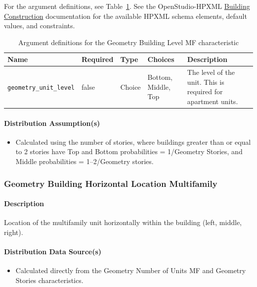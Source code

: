For the argument definitions, see Table~\ref{table:hc_arg_def_build_lev_mf}. See the OpenStudio-HPXML \href{https://openstudio-hpxml.readthedocs.io/en/v1.8.1/workflow_inputs.html#hpxml-building-construction}{Building Construction} documentation for the available HPXML schema elements, default values, and constraints.

\begin{longtable}[]{ |p{}|p{1.5cm}|p{1.1cm}|p{1.4cm}|p{6cm}| }
\caption{Argument definitions for the Geometry Building Level MF characteristic} \label{table:hc_arg_def_build_lev_mf}  \\
\toprule\noalign{}
Name & Required & Type & Choices & Description \\
\midrule\noalign{}
\endhead
\bottomrule\noalign{}
\endlastfoot
\texttt{geometry\_unit\_level} & false & Choice & Bottom, Middle, Top
& The level of the unit. This is required for apartment units. \\
\end{longtable}

\paragraph{Distribution Assumption(s)}
\begin{itemize}
    \item Calculated using the number of stories, where buildings greater than or equal to 2 stories have Top and Bottom probabilities = 1/Geometry Stories, and Middle probabilities = 1--2/Geometry stories.
\end{itemize}


\subsubsection{Geometry Building Horizontal Location Multifamily}
\paragraph{Description}
Location of the multifamily unit horizontally within the building (left, middle, right).

\paragraph{Distribution Data Source(s)}
\begin{itemize}
    \item Calculated directly from the Geometry Number of Units MF and Geometry Stories characteristics.
\end{itemize}

